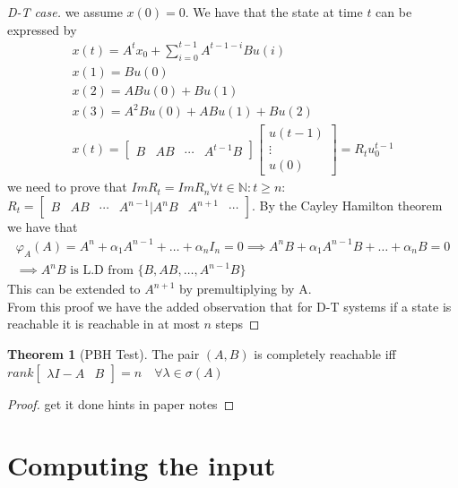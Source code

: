 \documentclass{book}
\newcommand{\N}{\mathbb{N}}
\theoremstyle{definition}
\newtheorem{theorem}{Theorem}[section]
\theoremstyle{remark}
\theoremstyle{remark}
\begin{document}
\begin{proof}[D-T case]
    we assume \(x(0)=0\). We have that the state at time $t$ can be expressed by
    \begin{gather*}x(t)=A^tx_0+\sum_{i=0}^{t-1} A^{t-1-i}Bu(i)\\
    x(1)=Bu(0)\\
    x(2)=ABu(0)+Bu(1)\\
    x(3)=A^2Bu(0)+ABu(1)+Bu(2)\\
    x(t)=\begin{bmatrix}
        B & AB & \cdots & A^{t-1}B
    \end{bmatrix}\begin{bmatrix}
        u(t-1)\\\vdots\\u(0)
    \end{bmatrix} = R_tu_0^{t-1}
    \end{gather*}
    we need to prove that \(ImR_t=ImR_n \forall t \in \N:t\geq n\):
    \(R_t=\begin{bmatrix}
        B & AB & \cdots & A^{n-1} | A^nB & A^{n+1} & \cdots
    \end{bmatrix}\). By the Cayley Hamilton theorem we have that
    \begin{gather*}
    \varphi_A(A)=A^n+\alpha_1A^{n-1}+\dots+\alpha_nI_n=0 \implies A^nB+\alpha_1A^{n-1}B+\dots+\alpha_nB=0\\
    \implies A^nB \text{ is L.D from } \{B,AB,\dots,A^{n-1}B\}
    \end{gather*}
    This can be extended to $A^{n+1}$ by premultiplying by A.\\
    From this proof we have the added observation that for D-T systems if a state is reachable it is reachable in at most $n$ steps
\end{proof}

\begin{theorem}[PBH Test]
    The pair $(A,B)$ is completely reachable iff $rank\begin{bmatrix}
        \lambda I-A & B
    \end{bmatrix}=n \quad \forall \lambda \in \sigma(A)$
\end{theorem}
\begin{proof}
    get it done hints in paper notes
\end{proof}

\section{Computing the input}
\end{document}
